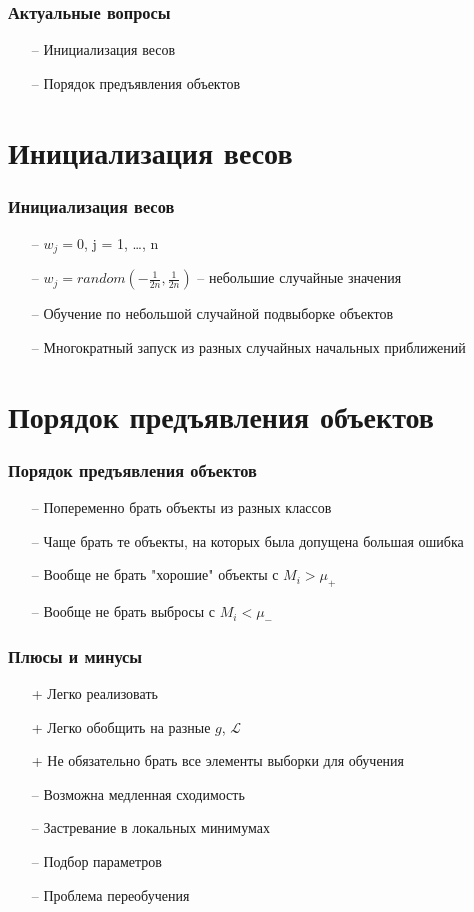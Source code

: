 \documentclass[10pt]{beamer}
\begin{document}
\begin{frame}\frametitle{Актуальные вопросы}
	\begin{itemize} [<+->]
		\item[--] Инициализация весов
		\item[--] Порядок предъявления объектов
	\end{itemize}
\end{frame}

\section{Инициализация весов}

\begin{frame}\frametitle{Инициализация весов}
	\begin{itemize}
		\item[--] $w_j = 0$, j = 1, \dots, n
		\item[--] $w_j = random(-\frac{1}{2n}, \frac{1}{2n})$ -- небольшие случайные значения
		\item[--] Обучение по небольшой случайной подвыборке объектов
		\item[--] Многократный запуск из разных случайных начальных приближений
	\end{itemize}
\end{frame}

\section{Порядок предъявления объектов}

\begin{frame}\frametitle{Порядок предъявления объектов}
	\begin{itemize}
		\item[--] Попеременно брать объекты из разных классов
		\item[--] Чаще брать те объекты, на которых была допущена большая ошибка
		\item[--] Вообще не брать "хорошие" объекты с $M_i > \mu_+$
		\item[--] Вообще не брать выбросы с $M_i < \mu_-$
	\end{itemize}
\end{frame}

\begin{frame}\frametitle{Плюсы и минусы}
	\begin{itemize} [<+->]
	\item[+] Легко реализовать
	\item[+] Легко обобщить на разные $g$, $\mathcal{L}$
	\item[+] Не обязательно брать все элементы выборки для обучения
	\bigbreak
	\item[--] Возможна медленная сходимость
	\item[--] Застревание в локальных минимумах
	\item[--] Подбор параметров
	\item[--] Проблема переобучения
	\end{itemize}
\end{frame}
\end{document}
